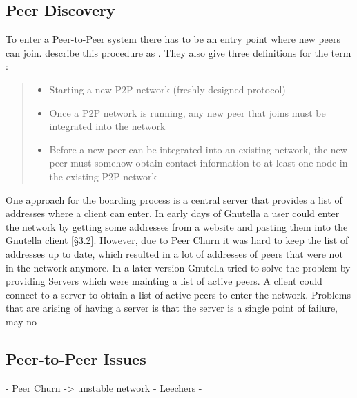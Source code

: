 \subsection{Peer Discovery}
To enter a Peer-to-Peer system there has to be an entry point where new peers can join. 
\citet{p2p-bootstrapping} describe this procedure as . 
They also give three definitions for the term :
\begin{quote}
    \begin{itemize}
        \item Starting a new P2P network (freshly designed protocol)
        \item Once a P2P network is running, any new peer that joins must be integrated into the network
        \item Before a new peer can be integrated into an existing network, the new peer must somehow obtain contact information to at least one node in the existing P2P network
    \end{itemize}
\end{quote} \citet[p.3]{p2p-bootstrapping}

One approach for the boarding process is a central server that provides a list of addresses where a client can enter. In early days of Gnutella a user could enter the network by getting some addresses from a website and pasting them into the Gnutella client \cite{gnutellaAnalysis}[\S3.2]. However, due to Peer Churn it was hard to keep the list of addresses up to date, which resulted in a lot of addresses of peers that were not in the network anymore. In a later version Gnutella tried to solve the problem by providing  Servers which were mainting a list of active peers. A client could conneet to a  server to obtain a list of active peers to enter the network. Problems that are arising of having a server is that the server is a single point of failure, may no

\subsection{Peer-to-Peer Issues}
- Peer Churn -> unstable network
- Leechers
- 
